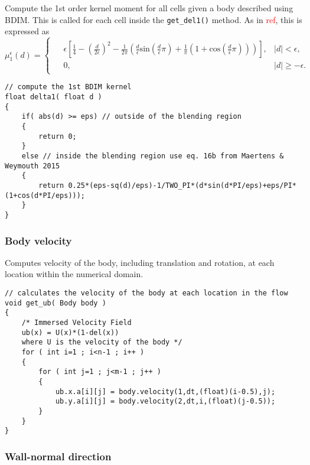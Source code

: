 \documentclass[notitlepage]{article}
\begin{document}
Compute the 1st order kernel moment for all cells given a body described using BDIM. This is called
for each cell inside the \texttt{get\_del1()} method. As in \textcolor{red}{ref}, this is expressed as
%
\begin{equation}\label{eq:label}
\mu_1^\epsilon(d) =
\begin{cases}
\begin{aligned}
& \epsilon \left \lbrack \frac{1}{4} -\left( \frac{d}{2\epsilon} \right)^2 - \frac{1}{2\pi} \left(\frac{d}{\epsilon} \mathrm{sin} \left(\frac{d}{\epsilon}\pi\right)
	+\frac{1}{\pi} \left( 1+\mathrm{cos} \left( \frac{d}{\epsilon} \pi \right)\right)\right) \right \rbrack, &\lvert d \rvert < \epsilon , \\
&0, &\lvert d \rvert  \geq -\epsilon.
\end{aligned}
\end{cases}
\end{equation}

\begin{lstlisting}[style=myCpp]
// compute the 1st BDIM kernel
float delta1( float d )
{
	if( abs(d) >= eps) // outside of the blending region
	{
		return 0;
	}
	else // inside the blending region use eq. 16b from Maertens & Weymouth 2015
	{
		return 0.25*(eps-sq(d)/eps)-1/TWO_PI*(d*sin(d*PI/eps)+eps/PI*(1+cos(d*PI/eps)));
	} 
}
\end{lstlisting}

\subsubsection{Body velocity}

Computes velocity of the body, including translation and rotation, at each location within the numerical domain.

\begin{lstlisting}[style=myCpp]
// calculates the velocity of the body at each location in the flow
void get_ub( Body body )
{
	/* Immersed Velocity Field
	ub(x) = U(x)*(1-del(x))
	where U is the velocity of the body */
	for ( int i=1 ; i<n-1 ; i++ )
	{
		for ( int j=1 ; j<m-1 ; j++ )
		{
			ub.x.a[i][j] = body.velocity(1,dt,(float)(i-0.5),j);
			ub.y.a[i][j] = body.velocity(2,dt,i,(float)(j-0.5));
		}
	}
}
\end{lstlisting}

\subsubsection{Wall-normal direction}
\end{document}
